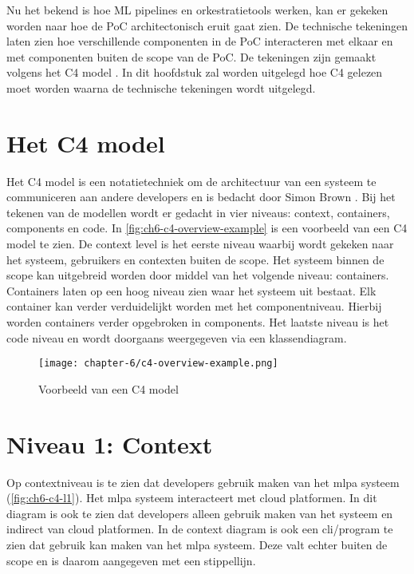 Nu het bekend is hoe ML pipelines en orkestratietools werken, kan er gekeken worden naar hoe de PoC architectonisch eruit gaat zien. De technische tekeningen laten zien hoe verschillende componenten in de PoC interacteren met elkaar en met componenten buiten de scope van de PoC. De tekeningen zijn gemaakt volgens het C4 model \cite{c4-model}. In dit hoofdstuk zal worden uitgelegd hoe C4 gelezen moet worden waarna de technische tekeningen wordt uitgelegd.

\section{Het C4 model}\label{sec:ch6-het-c4-model}
Het C4 model is een notatietechniek om de architectuur van een systeem te communiceren aan andere developers en is bedacht door Simon Brown \cite{c4-model}. Bij het tekenen van de modellen wordt er gedacht in vier niveaus: context, containers, components en code. In \autoref{fig:ch6-c4-overview-example} is een voorbeeld van een C4 model te zien. De context level is het eerste niveau waarbij wordt gekeken naar het systeem, gebruikers en contexten buiten de scope. Het systeem binnen de scope kan uitgebreid worden door middel van het volgende niveau: containers. Containers laten op een hoog niveau zien waar het systeem uit bestaat. Elk container kan verder verduidelijkt worden met het componentniveau. Hierbij worden containers verder opgebroken in components. Het laatste niveau is het code niveau en wordt doorgaans weergegeven via een klassendiagram. 

\begin{figure}[hbt!]
  \centering
  \texttt{[image: chapter-6/c4-overview-example.png]}
  \caption{Voorbeeld van een C4 model \cite{c4-model}}
  \label{fig:ch6-c4-overview-example}
\end{figure}

\newpage

\section{Niveau 1: Context}\label{sec:ch6-niveau-1-context}
Op contextniveau is te zien dat developers gebruik maken van het \acrfull{mlpa} systeem (\autoref{fig:ch6-c4-l1}). Het \acrshort{mlpa} systeem interacteert met cloud platformen. In dit diagram is ook te zien dat developers alleen gebruik maken van het systeem en indirect van cloud platformen. In de context diagram is ook een \acrfull{cli}/program te zien dat gebruik kan maken van het \acrshort{mlpa} systeem. Deze valt echter buiten de scope en is daarom aangegeven met een stippellijn.

